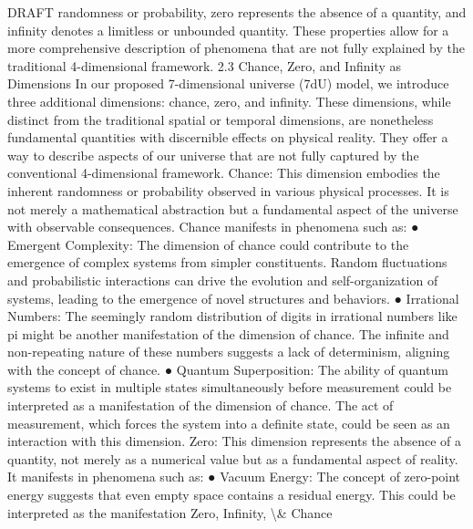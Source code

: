\documentclass[12pt]{article}
\begin{document}
DRAFT
randomness or probability, zero represents the absence of a quantity, and inﬁnity
denotes a limitless or unbounded quantity. These properties allow for a more
comprehensive description of phenomena that are not fully explained by the traditional
4-dimensional framework.
2.3 Chance, Zero, and Inﬁnity as Dimensions
In our proposed 7-dimensional universe (7dU) model, we introduce three additional
dimensions: chance, zero, and inﬁnity. These dimensions, while distinct from the
traditional spatial or temporal dimensions, are nonetheless fundamental quantities with
discernible eﬀects on physical reality. They oﬀer a way to describe aspects of our
universe that are not fully captured by the conventional 4-dimensional framework.
Chance: This dimension embodies the inherent randomness or probability observed in
various physical processes. It is not merely a mathematical abstraction but a
fundamental aspect of the universe with observable consequences. Chance manifests
in phenomena such as:
●
Emergent Complexity: The dimension of chance could contribute to the
emergence of complex systems from simpler constituents. Random ﬂuctuations
and probabilistic interactions can drive the evolution and self-organization of
systems, leading to the emergence of novel structures and behaviors.
●
Irrational Numbers: The seemingly random distribution of digits in irrational
numbers like pi might be another manifestation of the dimension of chance. The
inﬁnite and non-repeating nature of these numbers suggests a lack of
determinism, aligning with the concept of chance.
●
Quantum Superposition: The ability of quantum systems to exist in multiple
states simultaneously before measurement could be interpreted as a
manifestation of the dimension of chance. The act of measurement, which
forces the system into a deﬁnite state, could be seen as an interaction with this
dimension.
Zero: This dimension represents the absence of a quantity, not merely as a numerical
value but as a fundamental aspect of reality. It manifests in phenomena such as:
●
Vacuum Energy: The concept of zero-point energy suggests that even empty
space contains a residual energy. This could be interpreted as the manifestation
Zero, Infinity, \textbackslash{}& Chance
\end{document}
